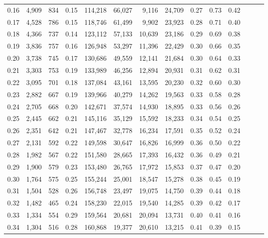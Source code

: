 \begin{tabular}{rrrrrrrrrrrrrr}
0.16 &  4,909 &  834 &  0.15 &  114,218 &   66,027 &   9,116 &  24,709 &  0.27 &  0.73 &      0.42 \\
0.17 &  4,528 &  786 &  0.15 &  118,746 &   61,499 &   9,902 &  23,923 &  0.28 &  0.71 &      0.40 \\
0.18 &  4,366 &  737 &  0.14 &  123,112 &   57,133 &  10,639 &  23,186 &  0.29 &  0.69 &      0.38 \\
0.19 &  3,836 &  757 &  0.16 &  126,948 &   53,297 &  11,396 &  22,429 &  0.30 &  0.66 &      0.35 \\
0.20 &  3,738 &  745 &  0.17 &  130,686 &   49,559 &  12,141 &  21,684 &  0.30 &  0.64 &      0.33 \\
0.21 &  3,303 &  753 &  0.19 &  133,989 &   46,256 &  12,894 &  20,931 &  0.31 &  0.62 &      0.31 \\
0.22 &  3,095 &  701 &  0.18 &  137,084 &   43,161 &  13,595 &  20,230 &  0.32 &  0.60 &      0.30 \\
0.23 &  2,882 &  667 &  0.19 &  139,966 &   40,279 &  14,262 &  19,563 &  0.33 &  0.58 &      0.28 \\
0.24 &  2,705 &  668 &  0.20 &  142,671 &   37,574 &  14,930 &  18,895 &  0.33 &  0.56 &      0.26 \\
0.25 &  2,445 &  662 &  0.21 &  145,116 &   35,129 &  15,592 &  18,233 &  0.34 &  0.54 &      0.25 \\
0.26 &  2,351 &  642 &  0.21 &  147,467 &   32,778 &  16,234 &  17,591 &  0.35 &  0.52 &      0.24 \\
0.27 &  2,131 &  592 &  0.22 &  149,598 &   30,647 &  16,826 &  16,999 &  0.36 &  0.50 &      0.22 \\
0.28 &  1,982 &  567 &  0.22 &  151,580 &   28,665 &  17,393 &  16,432 &  0.36 &  0.49 &      0.21 \\
0.29 &  1,900 &  579 &  0.23 &  153,480 &   26,765 &  17,972 &  15,853 &  0.37 &  0.47 &      0.20 \\
0.30 &  1,764 &  575 &  0.25 &  155,244 &   25,001 &  18,547 &  15,278 &  0.38 &  0.45 &      0.19 \\
0.31 &  1,504 &  528 &  0.26 &  156,748 &   23,497 &  19,075 &  14,750 &  0.39 &  0.44 &      0.18 \\
0.32 &  1,482 &  465 &  0.24 &  158,230 &   22,015 &  19,540 &  14,285 &  0.39 &  0.42 &      0.17 \\
0.33 &  1,334 &  554 &  0.29 &  159,564 &   20,681 &  20,094 &  13,731 &  0.40 &  0.41 &      0.16 \\
0.34 &  1,304 &  516 &  0.28 &  160,868 &   19,377 &  20,610 &  13,215 &  0.41 &  0.39 &      0.15 \\

\end{tabular}
